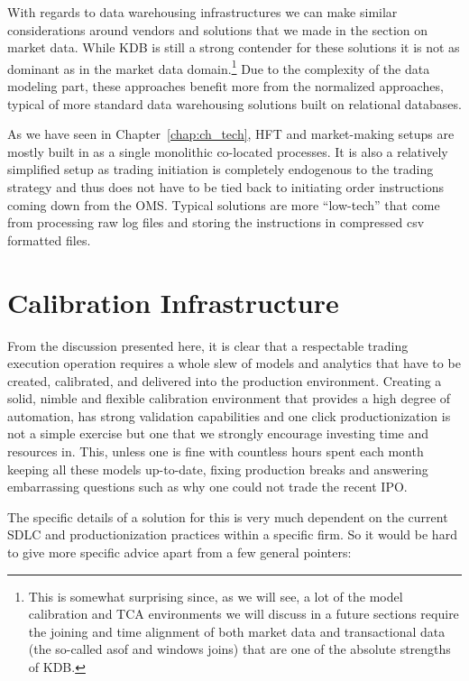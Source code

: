 With regards to data warehousing infrastructures we can make similar considerations around vendors and solutions that we made in the section on market data. While KDB is still a strong contender for these solutions it is not as dominant as in the market data domain.\footnote{This is somewhat surprising since, as we will see, a lot of the model calibration and TCA environments we will discuss in a future sections require the joining and time alignment of both market data and transactional data (the so-called asof and windows joins) that are one of the absolute strengths of KDB.} Due to the complexity of the data modeling part, these approaches benefit more from the normalized approaches, typical of more standard data warehousing solutions built on relational databases. 


As we have seen in Chapter~\ref{chap:ch_tech}, HFT and market-making setups are mostly built in as a single monolithic co-located processes. It is also a relatively simplified setup as trading initiation is completely endogenous to the trading strategy and thus does not have to be tied back to initiating order instructions coming down from the OMS. Typical solutions are more ``low-tech'' that come from processing raw log files and storing the instructions in compressed csv formatted files.\label{in:dat_infr2}



\section{Calibration Infrastructure\label{sec:calb_infra}} \label{in:calb1}

From the discussion presented here, it is clear that a respectable trading execution operation requires a whole slew of models and analytics that have to be created, calibrated, and delivered into the production environment. Creating a solid, nimble and flexible calibration environment that provides a high degree of automation, has strong validation capabilities and one click productionization is not a simple exercise but one that we strongly encourage investing time and resources in. This, unless one is fine with countless hours spent each month keeping all these models up-to-date, fixing production breaks and answering embarrassing questions such as why one could not trade the recent IPO. 


The specific details of a solution for this is very much dependent on the current SDLC and productionization practices within a specific firm. So it would be hard to give more specific advice apart from a few general pointers:

